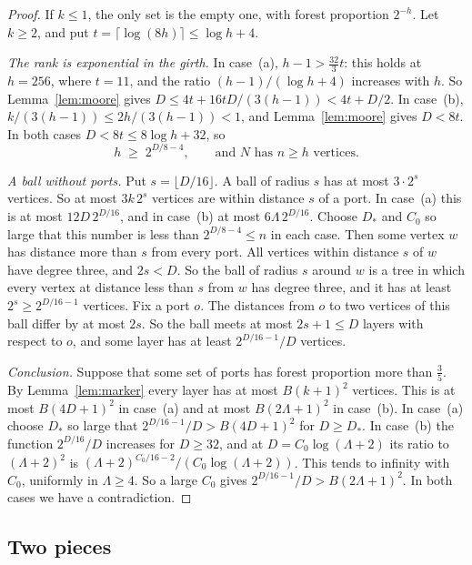 \begin{proof}
If $k\le1$, the only set is the empty one, with forest proportion $2^{-h}$. Let $k\ge2$, and put
$t=\lceil\log(8h)\rceil\le\log h+4$.

\emph{The rank is exponential in the girth.} In case~(a), $h-1>\frac{32}3t$: this holds at
$h=256$, where $t=11$, and the ratio $(h-1)/(\log h+4)$ increases with $h$. So
Lemma~\ref{lem:moore} gives $D\le4t+16tD/(3(h-1))<4t+D/2$. In case~(b),
$k/(3(h-1))\le2h/(3(h-1))<1$, and Lemma~\ref{lem:moore} gives $D<8t$. In both cases
$D<8t\le8\log h+32$, so
\begin{equation}\label{eq:rankgirth}
  h\;\ge\;2^{D/8-4},\qquad\text{and }N\text{ has }n\ge h\text{ vertices}.
\end{equation}

\emph{A ball without ports.} Put $s=\lfloor D/16\rfloor$. A ball of radius $s$ has at most
$3\cdot2^{s}$ vertices. So at most $3k\,2^{s}$ vertices are within distance $s$ of a port. In
case~(a) this is at most $12D\,2^{D/16}$, and in case~(b) at most $6\Lambda\,2^{D/16}$. Choose
$D_{*}$ and $C_0$ so large that this number is less than $2^{D/8-4}\le n$ in each case. Then some
vertex $w$ has distance more than $s$ from every port. All vertices within distance $s$ of $w$
have degree three, and $2s<D$. So the ball of radius $s$ around $w$ is a tree in which every
vertex at distance less than $s$ from $w$ has degree three, and it has at least
$2^{s}\ge2^{D/16-1}$ vertices. Fix a port $o$. The distances from $o$ to two vertices of this ball
differ by at most $2s$. So the ball meets at most $2s+1\le D$ layers with respect to $o$, and some
layer has at least $2^{D/16-1}/D$ vertices.

\emph{Conclusion.} Suppose that some set of ports has forest proportion more than $\frac35$. By
Lemma~\ref{lem:marker} every layer has at most $B(k+1)^{2}$ vertices. This is at most
$B(4D+1)^{2}$ in case~(a) and at most $B(2\Lambda+1)^{2}$ in case~(b). In case~(a) choose $D_{*}$ so
large that $2^{D/16-1}/D>B(4D+1)^{2}$ for $D\ge D_{*}$. In case~(b) the function $2^{D/16}/D$
increases for $D\ge32$, and at $D=C_0\log(\Lambda+2)$ its ratio to $(\Lambda+2)^{2}$ is
$(\Lambda+2)^{C_0/16-2}/(C_0\log(\Lambda+2))$. This tends to infinity with $C_0$, uniformly in
$\Lambda\ge4$. So a large $C_0$ gives $2^{D/16-1}/D>B(2\Lambda+1)^{2}$. In both cases we have a
contradiction.
\end{proof}

\subsection{Two pieces}

